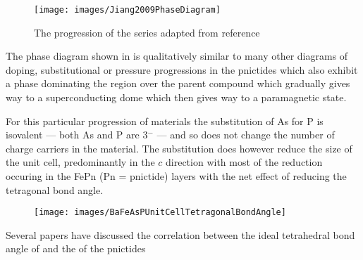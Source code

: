 \begin{figure}[h]
    \begin{center}
        \texttt{[image: images/Jiang2009PhaseDiagram]}
        \caption{The progression of the \BaFePAs series adapted from reference\cite{Jiang2009}}
        \label{Figure:PhaseDiagram:Jiang2009}
    \end{center}
\end{figure}

The phase diagram shown in \fig\cite{Figure:PhaseDiagram:Jiang2009} is qualitatively similar to many other diagrams of doping, substitutional or pressure progressions in the pnictides which also exhibit a \sdw phase dominating the region over the parent compound which gradually gives way to a superconducting dome which then gives way to a paramagnetic state\cite{Uemura2009}.

For this particular progression of materials the substitution of As for P is isovalent --- both As and P are 3$^{-}$ --- and so does not change the number of charge carriers in the material. The substitution does however reduce the size of the unit cell, predominantly in the $c$ direction with most of the reduction occuring in the FePn (Pn = pnictide) layers\cite{Jiang2009} with the net effect of reducing the tetragonal bond angle.

\begin{figure}[h]
    \begin{center}
        \texttt{[image: images/BaFeAsPUnitCellTetragonalBondAngle]}
        \caption{}
        \label{Figure:BaFeAsPUnitCellTetragonalBondAngle}
    \end{center}
\end{figure}

Several papers have discussed the correlation between the ideal tetrahedral bond angle of \deg and the \Tc of the pnictides\cite{Matsumura2010}
